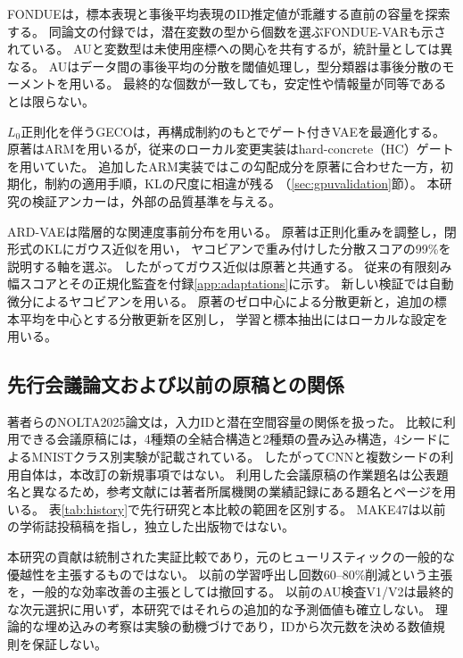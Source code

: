 \documentclass[11pt,a4paper]{ltjsarticle}
\begin{document}
FONDUE\cite{bonheme2022fondue}は，標本表現と事後平均表現のID推定値が乖離する直前の容量を探索する。
同論文の付録では，潜在変数の型から個数を選ぶFONDUE-VARも示されている。
AUと変数型は未使用座標への関心を共有するが，統計量としては異なる。
AUはデータ間の事後平均の分散を閾値処理し，型分類器は事後分散のモーメントを用いる\cite{bonheme2023active}。
最終的な個数が一致しても，安定性や情報量が同等であるとは限らない。

$L_0$正則化を伴うGECOは，再構成制約のもとでゲート付きVAEを最適化する\cite{deboom2020geco,rezende2018geco}。
原著はARMを用いるが，従来のローカル変更実装はhard-concrete（HC）ゲートを用いていた\cite{louizos2018l0}。
追加したARM実装ではこの勾配成分を原著に合わせた一方，初期化，制約の適用手順，KLの尺度に相違が残る
（\ref{sec:gpuvalidation}節）。
本研究の検証アンカーは，外部の品質基準を与える。

ARD-VAEは階層的な関連度事前分布を用いる\cite{saha2025ardvae}。
原著は正則化重みを調整し，閉形式のKLにガウス近似を用い，
ヤコビアンで重み付けした分散スコアの99\%を説明する軸を選ぶ。
したがってガウス近似は原著と共通する。
従来の有限刻み幅スコアとその正規化監査を付録\ref{app:adaptations}に示す。
新しい検証では自動微分によるヤコビアンを用いる。
原著のゼロ中心による分散更新と，追加の標本平均を中心とする分散更新を区別し，
学習と標本抽出にはローカルな設定を用いる。

\subsection{先行会議論文および以前の原稿との関係}
著者らのNOLTA2025論文\cite{obata2025manifold}は，入力IDと潜在空間容量の関係を扱った。
比較に利用できる会議原稿には，4種類の全結合構造と2種類の畳み込み構造，4シードによるMNISTクラス別実験が記載されている。
したがってCNNと複数シードの利用自体は，本改訂の新規事項ではない。
利用した会議原稿の作業題名は公表題名と異なるため，参考文献には著者所属機関の業績記録にある題名とページを用いる。
表\ref{tab:history}で先行研究と本比較の範囲を区別する。
MAKE47は以前の学術誌投稿稿を指し，独立した出版物ではない。

本研究の貢献は統制された実証比較であり，元のヒューリスティックの一般的な優越性を主張するものではない。
以前の学習呼出し回数60--80\%削減という主張を，一般的な効率改善の主張としては撤回する。
以前のAU検査V1/V2は最終的な次元選択に用いず，本研究ではそれらの追加的な予測価値も確立しない。
理論的な埋め込みの考察は実験の動機づけであり，IDから次元数を決める数値規則を保証しない。
\end{document}

